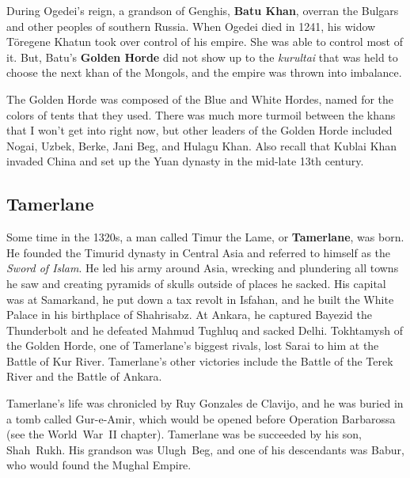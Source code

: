 During Ogedei's reign, a grandson of Genghis, \textbf{Batu Khan},
overran the Bulgars and other peoples of southern Russia.
When Ogedei died in 1241, his widow T\"oregene Khatun took over control of his empire.
She was able to control most of it.
But, Batu's \textbf{Golden Horde} did not show up to the
\textit{kurultai} that was held to choose the next khan of the Mongols,
and the empire was thrown into imbalance.

The Golden Horde was composed of the Blue and White Hordes, named for the colors of tents that they used.
There was much more turmoil between the khans that I won't get into right now,
but other leaders of the Golden Horde included Nogai, Uzbek, Berke, Jani Beg, and Hulagu Khan.
Also recall that Kublai Khan invaded China and set up the Yuan dynasty in the mid-late 13th century.

\subsection*{Tamerlane}

Some time in the 1320s, a man called Timur the Lame, or \textbf{Tamerlane}, was born.
He founded the Timurid dynasty in Central Asia and referred to himself as the \textit{Sword of Islam}.
He led his army around Asia,
wrecking and plundering all towns he saw and creating pyramids of skulls outside of places he sacked.
His capital was at Samarkand, he put down a tax revolt in Isfahan,
and he built the White Palace in his birthplace of Shahrisabz.
At Ankara, he captured Bayezid the Thunderbolt and he defeated Mahmud Tughluq and sacked Delhi.
Tokhtamysh of the Golden Horde, one of Tamerlane's biggest rivals, lost Sarai to him at the Battle of Kur River.
Tamerlane's other victories include the Battle of the Terek River and the Battle of Ankara.

Tamerlane's life was chronicled by Ruy Gonzales de Clavijo, and he was buried in a tomb called Gur-e-Amir,
which would be opened before Operation Barbarossa (see the World~War~II chapter).
Tamerlane was be succeeded by his son, Shah~Rukh.
His grandson was Ulugh~Beg, and one of his descendants was Babur, who would found the Mughal Empire.

